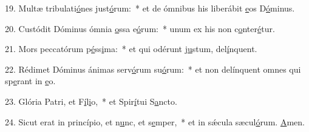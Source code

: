 19. Multæ tribulati\uline{ó}nes just\uline{ó}rum:~* et de ómnibus his liberábit \uline{e}os D\uline{ó}minus.\par 
20. Custódit Dóminus ómnia \uline{o}ssa e\uline{ó}rum:~* unum ex his non c\uline{o}nter\uline{é}tur.\par 
21. Mors peccatórum p\uline{é}ss\uline{i}ma:~* et qui odérunt j\uline{u}stum, del\uline{í}nquent.\par 
22. Rédimet Dóminus ánimas serv\uline{ó}rum su\uline{ó}rum:~* et non delínquent omnes qui sp\uline{e}rant in \uline{e}o.\par 
23. Glória Patri, et F\uline{í}l\uline{i}o,~* et Spir\uline{í}tui S\uline{a}ncto.\par 
24. Sicut erat in princípio, et n\uline{u}nc, et s\uline{e}mper,~* et in sǽcula sæcul\uline{ó}rum. \uline{A}men.\par 
